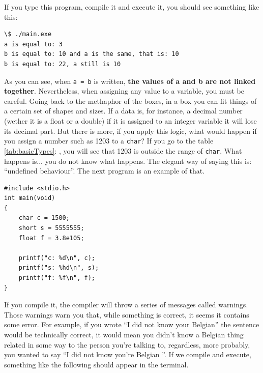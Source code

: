 \documentclass[a4paper]{article}
\begin{document}
If you type this program, compile it and execute it, you should see something
like this:

\noindent
\begin{minipage}[H]{\linewidth}
\mbox{}
\begin{lstlisting}[style=terminalStyle]
\$ ./main.exe
a is equal to: 3
b is equal to: 10 and a is the same, that is: 10
b is equal to: 22, a still is 10
\end{lstlisting}
\end{minipage}

As you can see, when \verb!a = b! is written, \textbf{the values of a and b are
not linked together}. Nevertheless, when assigning any value to a variable, you
must be careful. Going back to the methaphor of the boxes, in a box you can fit
things of a certain set of shapes and sizes. If a data is, for instance, a
decimal number (wether it is a float or a double) if it is assigned to an
integer variable it will lose its decimal part. But there is more, if you apply
this logic, what would happen if you assign a number such as 1203 to a
\verb!char!? If you go to the table \ref{tab:basicTypes}:
, you will see that 1203 is outside the range of
\verb!char!. What happens is... you do not know what happens. The elegant way of
saying this is: ``undefined behaviour''. The next program is an example of that.


\noindent
\begin{minipage}[H]{\linewidth}
\mbox{}
\begin{lstlisting}[style=C, caption={Erroneous assignments},
label={lst:invalidAssignations}]
#include <stdio.h>
int main(void)
{
    char c = 1500;
    short s = 5555555;
    float f = 3.8e105;

    printf("c: %d\n", c);
    printf("s: %hd\n", s);
    printf("f: %f\n", f);
}
\end{lstlisting}
\end{minipage}

If you compile it, the compiler will throw a series of messages called warnings.
Those warnings warn you that, while something is correct, it seems it contains
some error. For example, if you wrote ``I did not know your Belgian'' the
sentence would be technically correct, it would mean you didn't know a Belgian
thing related in some way to the person you're talking to, regardless, more
probably, you wanted to say  ``I did not know you're Belgian ''. If we compile
and execute, something like the following should appear in the terminal.
\end{document}
